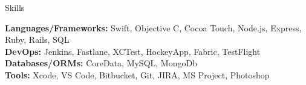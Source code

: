 \documentclass{resume} %
\begin{document}

\begin{rSection}{Skills}

\textbf{Languages/Frameworks:} Swift, Objective C, Cocoa Touch, Node.js, Express, Ruby, Rails, SQL  \\
\textbf{DevOps:} Jenkins, Fastlane, XCTest, HockeyApp, Fabric, TestFlight \\
\textbf{Databases/ORMs:} CoreData, MySQL, MongoDb  \\
\textbf{Tools:} Xcode, VS Code, Bitbucket, Git, JIRA, MS Project, Photoshop  \\

\end{rSection}

\end{document}
